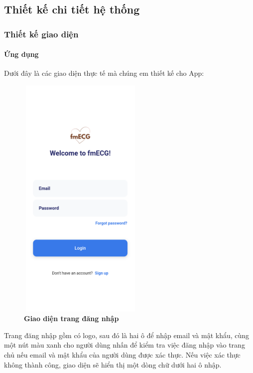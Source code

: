 \subsection{Thiết kế chi tiết hệ thống}



\subsubsection{Thiết kế giao diện}

\paragraph{Ứng dụng}
\mbox{}

Dưới đây là các giao diện thực tế mà chúng em thiết kế cho App:
\begin{figure}[H]
  \centering
  \includegraphics[width=6cm,height=12cm]{Images/mobile_app/demo/login.png}
  \caption[Giao diện trang đăng nhập]{\bfseries \fontsize{12pt}{0pt}\selectfont Giao diện trang đăng nhập}
  \label{demo_login} %
\end{figure}

Trang đăng nhập gồm có logo, sau đó là hai ô để nhập email và mật khẩu, cùng một nút màu xanh cho người dùng nhấn để kiểm tra 
việc đăng nhập vào
trang chủ nếu email và mật khẩu của người dùng được xác thực. Nếu việc xác thực không thành công, giao diện sẽ hiển thị
một dòng chữ dưới hai ô nhập.

